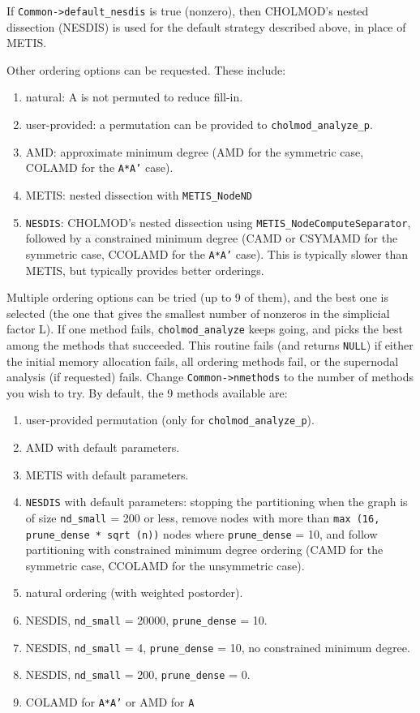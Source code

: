 \documentclass[11pt]{article}
\begin{document}
If {\tt Common->default\_nesdis} is true (nonzero), then CHOLMOD's
nested dissection (NESDIS) is used for the default strategy described
above, in place of METIS.

Other ordering options can be requested.  These include:
\begin{enumerate}
\item	natural:    A is not permuted to reduce fill-in.
\item	user-provided:	    a permutation can be provided to {\tt cholmod\_analyze\_p}.
\item	AMD:	    approximate minimum degree (AMD for the symmetric case, COLAMD for the {\tt A*A'} case).
\item	METIS:	    nested dissection with {\tt METIS\_NodeND}
\item	{\tt NESDIS}:	    CHOLMOD's nested dissection using
    {\tt METIS\_NodeComputeSeparator},
    followed by a constrained minimum degree
    (CAMD or CSYMAMD for the symmetric case, CCOLAMD for the {\tt A*A'} case).
    This is typically slower than METIS, but typically provides better orderings.
\end{enumerate}

Multiple ordering options can be tried (up to 9 of them), and the best one
is selected (the one that gives the smallest number of nonzeros in the
simplicial factor L).  If one method fails, {\tt cholmod\_analyze} keeps going, and
picks the best among the methods that succeeded.  This routine fails (and
returns {\tt NULL}) if either the initial memory allocation fails, all ordering methods
fail, or the supernodal analysis (if requested) fails.  Change {\tt Common->nmethods} to the
number of methods you wish to try.  By default, the 9 methods available are:

\begin{enumerate}
\item user-provided permutation (only for {\tt cholmod\_analyze\_p}).
\item AMD with default parameters.
\item METIS with default parameters.
\item {\tt NESDIS} with default parameters: stopping the partitioning when
	    the graph is of size {\tt nd\_small} = 200 or less, remove nodes with
	    more than {\tt max (16, prune\_dense * sqrt (n))} nodes where
	    {\tt prune\_dense} = 10, and follow partitioning with
	    constrained minimum degree ordering
	    (CAMD for the symmetric case,
	    CCOLAMD for the unsymmetric case).
\item natural ordering (with weighted postorder).
\item NESDIS, {\tt nd\_small} = 20000, {\tt prune\_dense} = 10.
\item NESDIS, {\tt nd\_small} =     4, {\tt prune\_dense} = 10,
    no constrained minimum degree.
\item NESDIS, {\tt nd\_small} =   200, {\tt prune\_dense} = 0.
\item COLAMD for {\tt A*A'} or AMD for {\tt A}
\end{enumerate}
\end{document}

